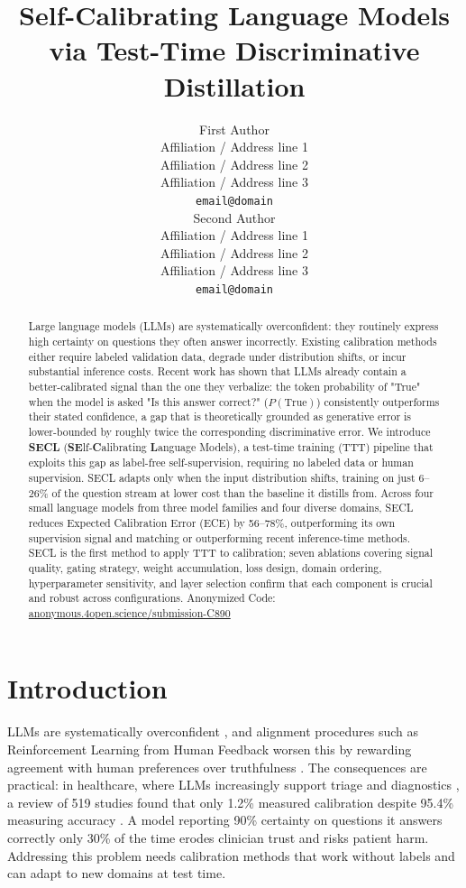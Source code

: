\documentclass[11pt]{article}
\title{Self-Calibrating Language Models via Test-Time Discriminative Distillation}
\author{First Author \\
  Affiliation / Address line 1 \\
  Affiliation / Address line 2 \\
  Affiliation / Address line 3 \\
  \texttt{email@domain} \\\And
  Second Author \\
  Affiliation / Address line 1 \\
  Affiliation / Address line 2 \\
  Affiliation / Address line 3 \\
  \texttt{email@domain} \\}
\begin{document}
\maketitle


\begin{abstract}
Large language models (LLMs) are systematically overconfident: they routinely express high certainty on questions they often answer incorrectly.
Existing calibration methods either require labeled validation data, degrade under distribution shifts, or incur substantial inference costs.
Recent work has shown that LLMs already contain a better-calibrated signal than the one they verbalize: the token probability of "True" when the model is asked "Is this answer correct?" ($P(\text{True})$) consistently outperforms their stated confidence, a gap that is theoretically grounded as generative error is lower-bounded by roughly twice the corresponding discriminative error.
We introduce \textbf{SECL} (\textbf{SE}lf-\textbf{C}alibrating \textbf{L}anguage Models), a test-time training (TTT) pipeline that exploits this gap as label-free self-supervision, requiring no labeled data or human supervision. SECL adapts only when the input distribution shifts, training on just 6--26\% of the question stream at lower cost than the baseline it distills from.
Across four small language models from three model families and four diverse domains, SECL reduces Expected Calibration Error (ECE) by 56--78\%, outperforming its own supervision signal and matching or outperforming recent inference-time methods.
SECL is the first method to apply TTT to calibration; seven ablations covering signal quality, gating strategy, weight accumulation, loss design, domain ordering, hyperparameter sensitivity, and layer selection confirm that each component is crucial and robust across configurations.
Anonymized Code: \href{https://anonymous.4open.science/r/secl-emnlp26-submission-C890}{anonymous.4open.science/submission-C890}
\end{abstract}

\section{Introduction} \label{sec:introduction}

LLMs are systematically overconfident \cite{jiang_how_2021, xiong_can_2024}, and alignment procedures such as Reinforcement Learning from Human Feedback \citep[RLHF;][]{bai_training_2022} worsen this by rewarding agreement with human preferences over truthfulness \cite{sharma_understanding_2024}. The consequences are practical: in healthcare, where LLMs increasingly support triage and diagnostics \cite{liu_application_2025}, a review of 519 studies found that only 1.2\% measured calibration despite 95.4\% measuring accuracy \cite{bedi_testing_2025}. A model reporting 90\% certainty on questions it answers correctly only 30\% of the time erodes clinician trust and risks patient harm. Addressing this problem needs calibration methods that work without labels and can adapt to new domains at test time.
\end{document}
